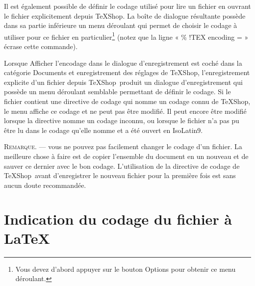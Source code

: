 \documentclass[11pt,french]{article}
\newcommand{\TS}{\textsf{\TeX Shop}}
\newcommand{\acr}[1]{\textsf{#1}}
\newcommand{\cmd}[1]{\textsf{#1}}
\begin{document}
Il est également possible de définir le codage utilisé pour lire un fichier en ouvrant le fichier explicitement depuis \TS. La boîte de dialogue résultante possède dans sa partie inférieure un menu déroulant qui permet de choisir le codage à utiliser pour ce fichier en particulier\footnote{Vous devez d'abord appuyer sur le bouton \cmd{Options} pour obtenir ce menu déroulant.} (notez que la ligne « \% !TEX encoding = » écrase cette commande).

Lorsque \cmd{Afficher l’encodage dans le dialogue d’enregistrement} est coché dans la catégorie \cmd{Documents et enregistrement} des réglages de \TS, l'enregistrement explicite d'un fichier depuis \TS\ produit un dialogue d'enregistrement qui possède un menu déroulant semblable permettant de définir le codage. Si le fichier contient une directive de codage qui nomme un codage connu de \TS, le menu affiche ce codage et ne peut pas être modifié. Il peut encore être modifié lorsque la directive nomme un codage inconnu, ou lorsque le fichier n'a pas pu être lu dans le codage qu'elle nomme et a été ouvert en \acr{IsoLatin9}.

\textsc{Remarque}. --- vous ne pouvez pas facilement changer le codage d'un fichier. La meilleure chose à faire est de copier l'ensemble du document en un nouveau et de sauver ce dernier avec le bon codage. L'utilisation de la directive de codage de \TS\ avant d'enregistrer le nouveau fichier pour la première fois est sans aucun doute recommandée.

\section{Indication du codage du fichier à \LaTeX}
\end{document}
